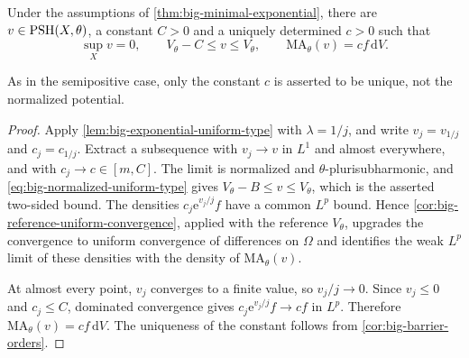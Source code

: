 \begin{theorem}\label{thm:big-minimal-normalized}
Under the assumptions of \cref{thm:big-minimal-exponential}, there are $v\in\mathrm{PSH}(X,\theta)$, a constant $C>0$ and a uniquely determined $c>0$ such that
\[
 \sup_Xv=0,
 \qquad V_\theta-C\leq v\leq V_\theta,
 \qquad \mathrm{MA}_\theta(v)=cf\,\mathrm{d}V.
\]
\end{theorem}

As in the semipositive case, only the constant $c$ is asserted to be unique, not the normalized potential.

\begin{proof}
Apply \cref{lem:big-exponential-uniform-type} with $\lambda=1/j$, and write $v_j=v_{1/j}$ and $c_j=c_{1/j}$. Extract a subsequence with $v_j\to v$ in $L^1$ and almost everywhere, and with $c_j\to c\in[m,C]$. The limit is normalized and $\theta$-plurisubharmonic, and \eqref{eq:big-normalized-uniform-type} gives $V_\theta-B\leq v\leq V_\theta$, which is the asserted two-sided bound. The densities $c_j\mathrm{e}^{v_j/j}f$ have a common $L^p$ bound. Hence \cref{cor:big-reference-uniform-convergence}, applied with the reference $V_\theta$, upgrades the convergence to uniform convergence of differences on $\Omega$ and identifies the weak $L^p$ limit of these densities with the density of $\mathrm{MA}_\theta(v)$.

At almost every point, $v_j$ converges to a finite value, so $v_j/j\to0$. Since $v_j\leq0$ and $c_j\leq C$, dominated convergence gives $c_j\mathrm{e}^{v_j/j}f\to cf$ in $L^p$. Therefore $\mathrm{MA}_\theta(v)=cf\,\mathrm{d}V$. The uniqueness of the constant follows from \cref{cor:big-barrier-orders}.
\end{proof}
